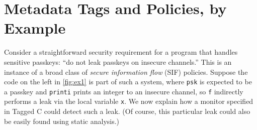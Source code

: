 \section{Metadata Tags and Policies, by Example}
\label{ch4:sec:example}

Consider a straightforward security requirement for a program that handles sensitive passkeys:
``do not leak passkeys on insecure channels.'' This is an instance of a broad class of
{\em secure information flow} (SIF) policies. Suppose the code on the left in \cref{fig:ex1} is part of
such a system, where {\tt psk} is expected to be a passkey and {\tt printi}
prints an integer to an insecure channel, so {\tt f} indirectly performs a leak via the
local variable {\tt x}.  We now explain how a monitor specified in Tagged C could detect
such a leak. (Of course, this particular leak could also be easily found using static analysis.)

